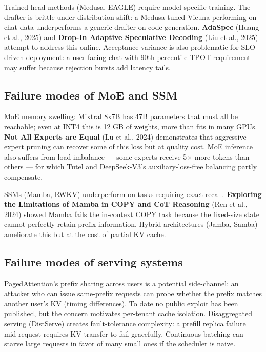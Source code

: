 Trained-head methods (Medusa, EAGLE) require model-specific training. The drafter is brittle under distribution shift: a Medusa-tuned Vicuna performing on chat data underperforms a generic drafter on code generation. \textbf{AdaSpec} (Huang et al., 2025) and \textbf{Drop-In Adaptive Speculative Decoding} (Liu et al., 2025) attempt to address this online. Acceptance variance is also problematic for SLO-driven deployment: a user-facing chat with 90th-percentile TPOT requirement may suffer because rejection bursts add latency tails.

\subsection{Failure modes of MoE and SSM}\label{failure-modes-of-moe-and-ssm}

MoE memory swelling: Mixtral 8x7B has 47B parameters that must all be reachable; even at INT4 this is 12 GB of weights, more than fits in many GPUs. \textbf{Not All Experts are Equal} (Lu et al., 2024) demonstrates that aggressive expert pruning can recover some of this loss but at quality cost. MoE inference also suffers from load imbalance --- some experts receive 5× more tokens than others --- for which Tutel and DeepSeek-V3's auxiliary-loss-free balancing partly compensate.

SSMs (Mamba, RWKV) underperform on tasks requiring exact recall. \textbf{Exploring the Limitations of Mamba in COPY and CoT Reasoning} (Ren et al., 2024) showed Mamba fails the in-context COPY task because the fixed-size state cannot perfectly retain prefix information. Hybrid architectures (Jamba, Samba) ameliorate this but at the cost of partial KV cache.

\subsection{Failure modes of serving systems}\label{failure-modes-of-serving-systems}

PagedAttention's prefix sharing across users is a potential side-channel: an attacker who can issue same-prefix requests can probe whether the prefix matches another user's KV (timing differences). To date no public exploit has been published, but the concern motivates per-tenant cache isolation. Disaggregated serving (DistServe) creates fault-tolerance complexity: a prefill replica failure mid-request requires KV transfer to fail gracefully. Continuous batching can starve large requests in favor of many small ones if the scheduler is naive.

